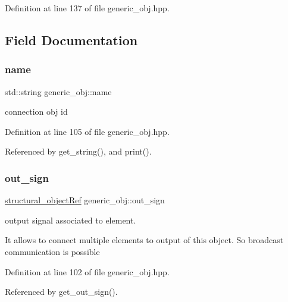 Definition at line 137 of file generic\+\_\+obj.\+hpp.



\subsection{Field Documentation}
\mbox{\label{classgeneric__obj_afb35a4055929764e503d9d6b4689c039}} 
\subsubsection{\texorpdfstring{name}{name}}
{\footnotesize\ttfamily std\+::string generic\+\_\+obj\+::name\hspace{0.3cm}{\ttfamily [protected]}}



connection obj id 



Definition at line 105 of file generic\+\_\+obj.\+hpp.



Referenced by get\+\_\+string(), and print().

\mbox{\label{classgeneric__obj_a89bc756ba7d468f622b65a5382f4f30c}} 
\subsubsection{\texorpdfstring{out\+\_\+sign}{out\_sign}}
{\footnotesize\ttfamily \hyperlink{structural__objects_8hpp_a8ea5f8cc50ab8f4c31e2751074ff60b2}{structural\+\_\+object\+Ref} generic\+\_\+obj\+::out\+\_\+sign\hspace{0.3cm}{\ttfamily [protected]}}



output signal associated to element. 

It allows to connect multiple elements to output of this object. So broadcast communication is possible 

Definition at line 102 of file generic\+\_\+obj.\+hpp.



Referenced by get\+\_\+out\+\_\+sign().

\mbox{\label{classgeneric__obj_ab8a229dbf309fa9ef1b893db684a81ab}} 

